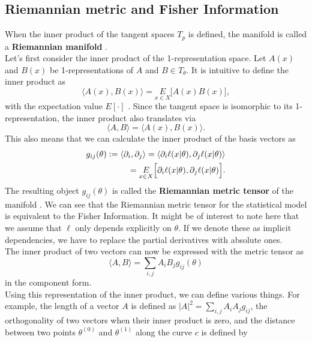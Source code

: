 \subsection{Riemannian metric and Fisher Information}\label{sec:RiemannianMetricAndFI}
When the inner product of the tangent spaces $T_p$ is defined, the manifold is called a \textbf{Riemannian manifold} \cite{AmarisLectureNotes}.\\
Let's first consider the inner product of the 1-representation space. Let $A(x)$ and $B(x)$ be 1-representations of $A$ and $B \in T_\theta$. It is intuitive to define the inner product as 
\begin{equation}
	\langle A(x), B(x) \rangle = \underset{x\in X}{E} \Big[A(x) B(x)\Big],
\end{equation}
with the expectation value $E[\cdot]$ \cite{AmarisLectureNotes}. Since the tangent space is isomorphic to its 1-representation, the inner product also translates via 
\begin{equation}
	\langle A, B \rangle = \langle A(x),B(x) \rangle.
\end{equation}
This also means that we can calculate the inner product of the basis vectors as \cite{AmarisLectureNotes}
\begin{equation}
	\begin{split}
		g_{ij}(\theta) \vcentcolon= \langle \partial_i, \partial_j\rangle = \langle \partial_i\ell(x|\theta), \partial_j\ell(x|\theta)\rangle \\
		= \underset{x \in X}{E} \Big[\partial_i\ell(x|\theta), \partial_j\ell(x|\theta)\Big].
	\end{split}
\end{equation}
The resulting object $g_{ij}(\theta)$ is called the \textbf{Riemannian metric tensor} of the manifold \cite{AmarisLectureNotes}. We can see that the Riemannian metric tensor for the statistical model is equivalent to the Fisher Information. It might be of interest to note here that we assume that $\ell$ only depends explicitly on $\theta$. If we denote these as implicit dependencies, we have to replace the partial derivatives with absolute ones.\\
The inner product of two vectors can now be expressed with the metric tensor as \cite{AmarisLectureNotes}
\begin{equation}
	\langle A,B \rangle = \sum_{i,j} A_iB_jg_{ij}(\theta)
\end{equation}
in the component form. \\
Using this representation of the inner product, we can define various things. For example, the length of a vector $A$ is defined as $|A|^2 = \sum_{i,j} A_iA_j g_{ij}$, the orthogonality of two vectors when their inner product is zero, and the distance between two points $\theta^{(0)}$ and $\theta^{(1)}$ along the curve $c$ is defined by \cite{AmarisLectureNotes}
